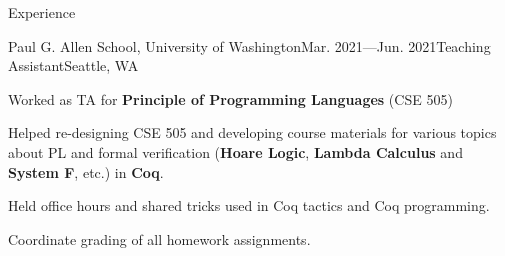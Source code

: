 \documentclass{resume}
\begin{document}
\begin{rSection}{Experience}
		\begin{rSubsection}{Paul G. Allen School, University of Washington}{Mar. 2021---Jun. 2021}{Teaching Assistant}{Seattle, WA}
			\item Worked as TA for \textbf{Principle of Programming Languages} (CSE 505)
			\item Helped re-designing CSE 505 and developing course materials for various topics about PL and formal verification (\textbf{Hoare Logic}, \textbf{Lambda Calculus} and \textbf{System F}, etc.) in \textbf{Coq}.
			\item Held office hours and shared tricks used in Coq tactics and Coq programming.
			\item Coordinate grading of all homework assignments.
		\end{rSubsection}


		\vspace{-5pt}


	\end{rSection}
	\vspace{-5pt}
\end{document}
